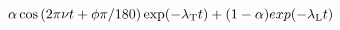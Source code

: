 \documentclass[12pt]{article}
\begin{document}
\begin{displaymath}
\alpha \cos\left(2\pi\nu t + \phi\pi/180\right) \exp(-\lambda_{\rm T} t) + (1-\alpha) exp(-\lambda_{\rm L} t)
\end{displaymath}
\end{document}
